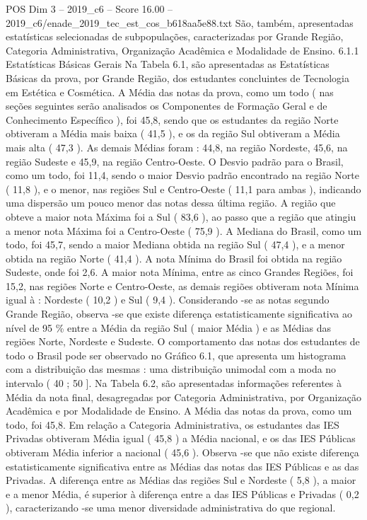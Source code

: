 \begin{textsample}{POS Dim 3 – 2019\_c6 – Score 16.00 – 2019\_c6/enade\_2019\_tec\_est\_cos\_b618aa5e88.txt}
São, também, apresentadas estatísticas selecionadas de subpopulações, caracterizadas por Grande Região, Categoria Administrativa, Organização Acadêmica e Modalidade de Ensino. 6.1.1 Estatísticas Básicas Gerais Na Tabela 6.1, são apresentadas as Estatísticas Básicas da prova, por Grande Região, dos estudantes concluintes de Tecnologia em Estética e Cosmética.
A Média das notas da prova, como um todo ( nas seções seguintes serão analisados os Componentes de Formação Geral e de Conhecimento Específico ), foi 45,8, sendo que os estudantes da região Norte obtiveram a Média mais baixa ( 41,5 ), e os da região Sul obtiveram a Média mais alta ( 47,3 ).
As demais Médias foram : 44,8, na região Nordeste, 45,6, na região Sudeste e 45,9, na região Centro-Oeste.
O Desvio padrão para o Brasil, como um todo, foi 11,4, sendo o maior Desvio padrão encontrado na região Norte ( 11,8 ), e o menor, nas regiões Sul e Centro-Oeste ( 11,1 para ambas ), indicando uma dispersão um pouco menor das notas dessa última região.
A região que obteve a maior nota Máxima foi a Sul ( 83,6 ), ao passo que a região que atingiu a menor nota Máxima foi a Centro-Oeste ( 75,9 ).
A Mediana do Brasil, como um todo, foi 45,7, sendo a maior Mediana obtida na região Sul ( 47,4 ), e a menor obtida na região Norte ( 41,4 ).
A nota Mínima do Brasil foi obtida na região Sudeste, onde foi 2,6.
A maior nota Mínima, entre as cinco Grandes Regiões, foi 15,2, nas regiões Norte e Centro-Oeste, as demais regiões obtiveram nota Mínima igual à : Nordeste ( 10,2 ) e Sul ( 9,4 ).
Considerando -se as notas segundo Grande Região, observa -se que existe diferença estatisticamente significativa ao nível de 95 \% entre a Média da região Sul ( maior Média ) e as Médias das regiões Norte, Nordeste e Sudeste.
O comportamento das notas dos estudantes de todo o Brasil pode ser observado no Gráfico 6.1, que apresenta um histograma com a distribuição das mesmas : uma distribuição unimodal com a moda no intervalo ( 40 ; 50 ].
Na Tabela 6.2, são apresentadas informações referentes à Média da nota final, desagregadas por Categoria Administrativa, por Organização Acadêmica e por Modalidade de Ensino.
A Média das notas da prova, como um todo, foi 45,8.
Em relação a Categoria Administrativa, os estudantes das IES Privadas obtiveram Média igual ( 45,8 ) a Média nacional, e os das IES Públicas obtiveram Média inferior a nacional ( 45,6 ).
Observa -se que não existe diferença estatisticamente significativa entre as Médias das notas das IES Públicas e as das Privadas.
A diferença entre as Médias das regiões Sul e Nordeste ( 5,8 ), a maior e a menor Média, é superior à diferença entre a das IES Públicas e Privadas ( 0,2 ), caracterizando -se uma menor diversidade administrativa do que regional.

\end{textsample}
